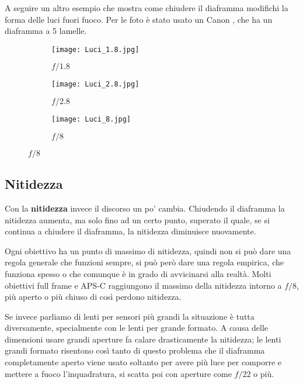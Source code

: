 A seguire un altro esempio che mostra come chiudere il diaframma modifichi la forma delle luci fuori fuoco. Per le foto è stato usato un Canon , che ha un diaframma a 5 lamelle.
\begin{figure}[H]
    \centering
        \begin{subfigure}{0.33\linewidth}
            \texttt{[image: Luci\_1.8.jpg]}
            \caption{$f/1.8$}
        \end{subfigure}
        \begin{subfigure}{0.33\linewidth}
            \texttt{[image: Luci\_2.8.jpg]}
            \caption{$f/2.8$}
        \end{subfigure}
    
        \begin{subfigure}{0.33\linewidth}
            \texttt{[image: Luci\_8.jpg]}
            \caption{$f/8$}
        \end{subfigure}

    \label{fig:diaframmaluci}
\end{figure}

\subsection{Nitidezza} \label{subsec:diaframmanitidezza}
Con la \textbf{nitidezza} invece il discorso un po' cambia. Chiudendo il diaframma la nitidezza aumenta, ma solo fino ad un certo punto, superato il quale, se si continua a chiudere il diaframma, la nitidezza diminuisce nuovamente.

Ogni obiettivo ha un punto di massimo di nitidezza, quindi non si può dare una regola generale che funzioni sempre, si può però dare una regola empirica, che funziona spesso o che comunque è in grado di avvicinarsi alla realtà.
Molti obiettivi full frame e APS-C raggiungono il massimo della nitidezza intorno a $f/8$, più aperto o più chiuso di così perdono nitidezza.

Se invece parliamo di lenti per sensori più grandi la situazione è tutta diversamente, specialmente con le lenti per grande formato. A causa delle dimensioni usare grandi aperture fa calare drasticamente la nitidezza; le lenti grandi formato risentono così tanto di questo problema che il diaframma completamente aperto viene usato soltanto per avere più luce per comporre e mettere a fuoco l'inquadratura, si scatta poi con aperture come $f/22$ o più.


